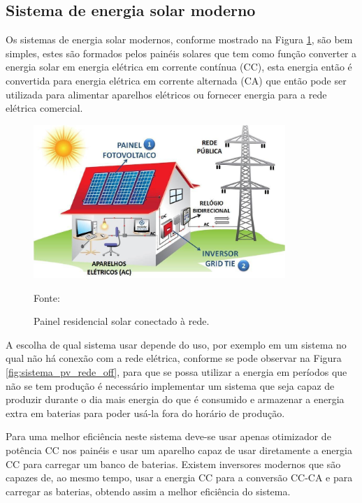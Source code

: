 \subsection{Sistema de energia solar moderno}

Os sistemas de energia solar modernos, conforme mostrado na Figura \ref{fig:sistema_pv_rede}, são bem simples, estes são formados pelos painéis solares que tem como função converter a energia solar em energia elétrica em corrente contínua (CC), esta energia então é convertida para energia elétrica em corrente alternada (CA) que então pode ser utilizada para alimentar aparelhos elétricos ou fornecer energia para a rede elétrica comercial.

\begin{figure}[H]
    \centering
    \includegraphics[width=0.85\textwidth]{./Figuras/sistema_pv_rede.jpg}
    \caption{Painel residencial solar conectado à rede.}{Fonte: \cite{neosolar}}
   \label{fig:sistema_pv_rede}
\end{figure}

A escolha de qual sistema usar depende do uso, por exemplo em um sistema no qual não há conexão com a rede elétrica, conforme se pode observar na Figura \ref{fig:sistema_pv_rede_off}, para que se possa utilizar a energia em períodos que não se tem produção é necessário implementar um sistema que seja capaz de produzir durante o dia mais energia do que é consumido e armazenar a energia extra em baterias para poder usá-la fora do horário de produção.

Para uma melhor eficiência neste sistema deve-se usar apenas otimizador de potência CC nos painéis e usar um aparelho capaz de usar diretamente a energia CC para carregar um banco de baterias. Existem inversores modernos que são capazes de, ao mesmo tempo, usar a energia CC para a conversão CC-CA e para carregar as baterias, obtendo assim a melhor eficiência do sistema.

